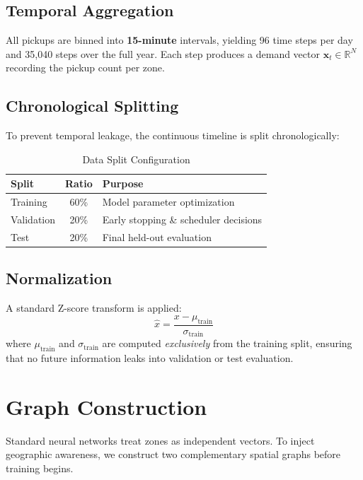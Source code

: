 \documentclass{rapportECL}
\begin{document}
\subsection{Temporal Aggregation}
All pickups are binned into \textbf{15-minute} intervals, yielding 96 time steps per day and 35{,}040 steps over the full year. Each step produces a demand vector $\mathbf{x}_t \in \mathbb{R}^{N}$ recording the pickup count per zone.

\subsection{Chronological Splitting}
To prevent temporal leakage, the continuous timeline is split chronologically:

\begin{table}[H]
\centering
\caption{Data Split Configuration}
\label{tab:splits}
\begin{tabular}{@{}lcl@{}}
\toprule
\textbf{Split} & \textbf{Ratio} & \textbf{Purpose} \\ \midrule
Training   & 60\% & Model parameter optimization \\
Validation & 20\% & Early stopping \& scheduler decisions \\
Test       & 20\% & Final held-out evaluation \\ \bottomrule
\end{tabular}
\end{table}

\subsection{Normalization}
A standard Z-score transform is applied:
\begin{equation}
\hat{x} = \frac{x - \mu_{\text{train}}}{\sigma_{\text{train}}}
\end{equation}
where $\mu_{\text{train}}$ and $\sigma_{\text{train}}$ are computed \textit{exclusively} from the training split, ensuring that no future information leaks into validation or test evaluation.

\section{Graph Construction}

Standard neural networks treat zones as independent vectors. To inject geographic awareness, we construct two complementary spatial graphs before training begins.
\end{document}

